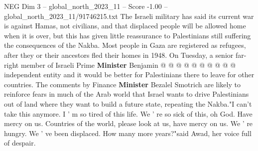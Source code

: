 \begin{textsample}{NEG Dim 3 – global\_north\_2023\_11 – Score -1.00 – global\_north\_2023\_11/91746215.txt}
The Israeli military has said its current war is against Hamas, not civilians, and that displaced people will be allowed home when it is over, but this has given little reassurance to Palestinians still suffering the consequences of the Nakba.
Most people in Gaza are registered as refugees, after they or their ancestors fled their homes in 1948.
On Tuesday, a senior far-right member of Israeli Prime \textbf{Minister} Benjamin @ @ @ @ @ @ @ @ @ @ independent entity and it would be better for Palestinians there to leave for other countries.
The comments by Finance \textbf{Minister} Bezalel Smotrich are likely to reinforce fears in much of the Arab world that Israel wants to drive Palestinians out of land where they want to build a future state, repeating the Nakba."I can't take this anymore.
I ' m so tired of this life.
We ' re so sick of this, oh God.
Have mercy on us.
Countries of the world, please look at us, have mercy on us.
We ' re hungry.
We ' ve been displaced.
How many more years?"said Awad, her voice full of despair.

\end{textsample}
